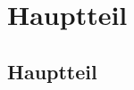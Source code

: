 

\chapter{Hauptteil}  %
\label{cha:} %
\section{Hauptteil} %
\label{sec:} %


\subsection{} %
\label{sse:}
\subsubsection{} %
\label{sss:}
